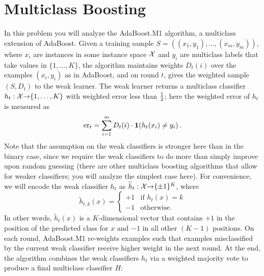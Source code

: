 \section{Multiclass Boosting } 

In this problem you will analyze the AdaBoost.M1 algorithm, a multiclass extension of AdaBoost. Given a training sample $S=((x_1,y_1),\ldots,(x_m,y_m))$, where $x_i$ are instances in some instance space ${\mathcal X}$ and $y_i$ are multiclass labels that take values in $\{1,\ldots,K\}$, the algorithm maintains weights $D_t(i)$ over the examples $(x_i,y_i)$ as in AdaBoost, and on round $t$, gives the weighted sample $(S,D_t)$ to the weak learner. The weak learner returns a multiclass classifier $h_t:{\mathcal X}{\rightarrow}\{1,\ldots,K\}$ with weighted error less than $\frac{1}{2}$; here the weighted error of $h_t$ is measured as 
\[
\textup{\textrm{er}}_t = \sum_{i=1}^m D_t(i) \cdot {\mathbf 1}(h_t(x_i) \neq y_i)
	\,.
\]
Note that the assumption on the weak classifiers is stronger here than in the binary case, since we require the weak classifiers to do more than simply improve upon random guessing (there are other multiclass boosting algorithms that allow for weaker classifiers; you will analyze the simplest case here). 
For convenience, we will encode the weak classifier $h_t$ as $\widetilde{h}_t:{\mathcal X}{\rightarrow}\{\pm1\}^K$, where 
\[
\tilde{h}_{t,k}(x) = 
\begin{cases}
	+1 & \text{if $h_t(x) = k$} \\
	-1 & \text{otherwise.}
\end{cases}
\]
In other words, $\tilde{h}_t(x)$ is a $K$-dimensional vector that contains $+1$ in the position of the predicted class for $x$ and $-1$ in all other $(K-1)$ positions.
On each round, AdaBoost.M1 re-weights examples such that examples misclassified by the current weak classifier receive higher weight in the next round. At the end, the algorithm combines the weak classifiers $h_t$ via a weighted majority vote to produce a final multiclass classifier $H$:
%
